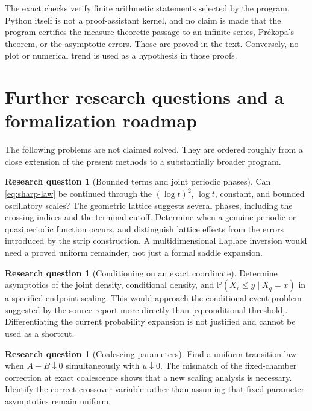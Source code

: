 \documentclass[11pt,a4paper]{article}
\theoremstyle{definition}
\newtheorem{question}[theorem]{Research question}
\theoremstyle{remark}
\newcommand{\PP}{\mathbb P}
\numberwithin{equation}{section}
\begin{document}
The exact checks verify finite arithmetic statements selected by the
program. Python itself is not a proof-assistant kernel, and no claim is
made that the program certifies the measure-theoretic passage to an
infinite series, Pr\'ekopa's theorem, or the asymptotic errors. Those are
proved in the text. Conversely, no plot or numerical trend is used as a
hypothesis in those proofs.

\section{Further research questions and a formalization roadmap}
\label{sec:questions}

The following problems are not claimed solved. They are ordered roughly
from a close extension of the present methods to a substantially broader
program.

\begin{question}[Bounded terms and joint periodic phases]
Can \eqref{eq:sharp-law} be continued through the $(\log t)^2$,
$\log t$, constant, and bounded oscillatory scales? The geometric lattice
suggests several phases, including the crossing indices and the terminal
cutoff. Determine when a genuine periodic or quasiperiodic function occurs,
and distinguish lattice effects from the errors introduced by the strip
construction. A multidimensional Laplace inversion would need a proved
uniform remainder, not just a formal saddle expansion.
\end{question}

\begin{question}[Conditioning on an exact coordinate]
Determine asymptotics of the joint density, conditional density, and
$\PP(X_r\le y\mid X_q=x)$ in a specified endpoint scaling. This would
approach the conditional-event problem suggested by the source report
more directly than \eqref{eq:conditional-threshold}. Differentiating the
current probability expansion is not justified and cannot be used as a
shortcut.
\end{question}

\begin{question}[Coalescing parameters]
Find a uniform transition law when $A-B\downarrow0$ simultaneously with
$u\downarrow0$. The mismatch of the fixed-chamber correction at exact
coalescence shows that a new scaling analysis is necessary. Identify the
correct crossover variable rather than assuming that fixed-parameter
asymptotics remain uniform.
\end{question}
\end{document}
